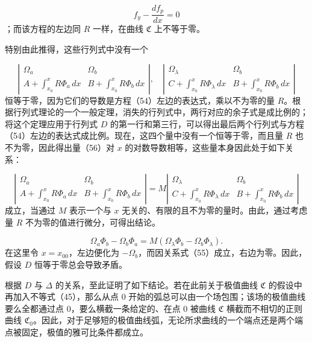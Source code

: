 \documentclass[11pt,a4paper,leqno]{article}
\begin{document}
\[
f_y-\frac{df_p}{dx}=0
\]
；而该方程的左边同 $R$ 一样，在曲线 $\mathfrak{C}$ 上不等于零。

特别由此推得，这些行列式中没有一个

\begin{equation}\tag{56}
\left|\begin{array}{cc}
\Omega_a&\Omega_b\\[.8ex]
A+\displaystyle\int_{x_0}^{x}R\Phi_a\,dx&B+\displaystyle\int_{x_0}^{x}R\Phi_b\,dx
\end{array}\right|,
\quad
\left|\begin{array}{cc}
\Omega_\lambda&\Omega_b\\[.8ex]
C+\displaystyle\int_{x_0}^{x}R\Phi_\lambda\,dx&B+\displaystyle\int_{x_0}^{x}R\Phi_b\,dx
\end{array}\right|
\end{equation}
恒等于零，因为它们的导数是方程（54）左边的表达式，乘以不为零的量 $R$。根据行列式理论的一个一般定理，消失的行列式中，两行对应的余子式是成比例的；将这个定理应用于行列式 $D$ 的第一行和第三行，可以得出最后两个行列式与方程（54）左边的表达式成比例。现在，这四个量中没有一个恒等于零，而且量 $R$ 也不为零，因此得出量（56）对 $x$ 的对数导数相等，这些量本身因此处于如下关系：

\[
\left|\begin{array}{cc}
\Omega_a&\Omega_b\\[.8ex]
A+\displaystyle\int_{x_0}^{x}R\Phi_a\,dx&B+\displaystyle\int_{x_0}^{x}R\Phi_b\,dx
\end{array}\right|
=M
\left|\begin{array}{cc}
\Omega_\lambda&\Omega_b\\[.8ex]
C+\displaystyle\int_{x_0}^{x}R\Phi_\lambda\,dx&B+\displaystyle\int_{x_0}^{x}R\Phi_b\,dx
\end{array}\right|
\]
成立，当通过 $M$ 表示一个与 $x$ 无关的、有限的且不为零的量时。由此，通过考虑量 $R$ 不为零的值进行微分，可得出结论。

\[
\Omega_a\Phi_b-\Omega_b\Phi_a=M(\Omega_\lambda\Phi_b-\Omega_b\Phi_\lambda).
\]
在这里令 $x=x_{00}$，左边便化为 $-\Omega_b$，而因关系式（55）成立，右边为零。因此，假设 $D$ 恒等于零总会导致矛盾。

根据 $D$ 与 $\Delta$ 的关系，至此证明了如下结论。若在此前关于极值曲线 $\mathfrak{C}$ 的假设中再加入不等式（45），那么从点 0 开始的弧总可以由一个场包围；该场的极值曲线要么全都通过点 0，要么横截一条给定的、在点 0 被曲线 $\mathfrak{C}$ 横截而不相切的正则曲线 $\mathfrak{C}_0$。因此，对于足够短的极值曲线弧，无论所求曲线的一个端点还是两个端点被固定，极值的雅可比条件都成立。
\end{document}

